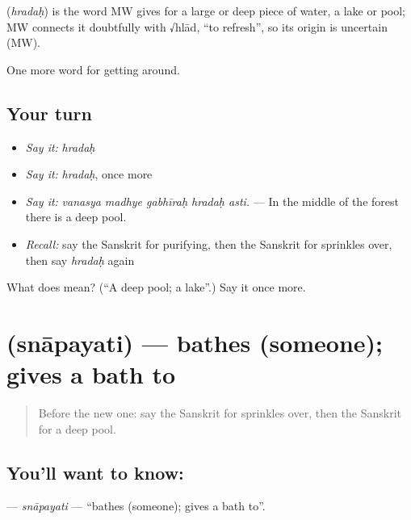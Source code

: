 \begin{cousinweb}
\textbf{} (\emph{hradaḥ}) is the word MW gives for a large or deep piece of water, a lake or pool; MW connects it doubtfully with √hlād, \textquotedblleft{}to refresh\textquotedblright{}, so its origin is uncertain (MW).
\end{cousinweb}

\begin{grammarlens}[title={What you've built}]
One more word for getting around.
\end{grammarlens}

\subsection*{Your turn}
\begin{itemize}
\raggedright
  \item \emph{Say it:} \emph{hradaḥ}
  \item \emph{Say it:} \emph{hradaḥ}, once more
  \item \emph{Say it:} \emph{vanasya madhye gabhīraḥ hradaḥ asti.} — In the middle of the forest there is a deep pool.
  \item \emph{Recall:} say the Sanskrit for purifying, then the Sanskrit for sprinkles over, then say \emph{hradaḥ} again
\end{itemize}

\begin{tcolorbox}[breakable,colback=teal!4,colframe=teal!35!black,title={Before you move on}]
What does  mean? (\textquotedblleft{}A deep pool; a lake\textquotedblright{}.) Say it once more.
\end{tcolorbox}
\section[\texorpdfstring{\sk{स्नापयति} (snāpayati)}{स्नापयति (snāpayati)}]{ (snāpayati) — bathes (someone); gives a bath to}

\label{lesson:SA-C399-snapayati}



\begin{quote}
Before the new one: say the Sanskrit for sprinkles over, then the Sanskrit for a deep pool.
\end{quote}

\subsection*{You'll want to know: }
\textbf{} — \emph{snāpayati} — \textquotedblleft{}bathes (someone); gives a bath to\textquotedblright{}.

